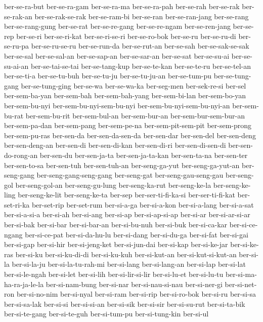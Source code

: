 {ber-se-ra-but ber-se-ra-gam ber-se-ra-ma ber-se-ra-pah ber-se-rah
ber-se-rak ber-se-rak-an ber-se-rak-se-rak ber-se-ram-bi ber-se-ran
ber-se-ran-jang ber-se-rang ber-se-rang-gung ber-se-rat ber-se-re-gang
ber-se-re-ngam ber-se-ren-jang ber-se-rep ber-se-ri ber-se-ri-kat
ber-se-ri-se-ri ber-se-ro-bok ber-se-ru ber-se-ru-di ber-se-ru-pa
ber-se-ru-se-ru ber-se-run-da ber-se-rut-an ber-se-sah ber-se-sak-se-sak
ber-se-sal ber-se-sal-an ber-se-sap-an ber-se-sar-an ber-se-sat
ber-se-su-ai ber-se-su-ai-an ber-se-tai-se-tai ber-se-tang-kup
ber-se-te-kan ber-se-te-ru ber-se-tel-an ber-se-ti-a ber-se-tu-buh
ber-se-tu-ju ber-se-tu-ju-an ber-se-tum-pu ber-se-tung-gang
ber-se-tung-ging ber-se-wa ber-se-wa-ka ber-seg-men ber-sek-re-si ber-sel
ber-sem-ba-yan ber-sem-bah ber-sem-bah-yang ber-sem-bi-lan ber-sem-bo-yan
ber-sem-bu-nyi ber-sem-bu-nyi-sem-bu-nyi ber-sem-bu-nyi-sem-bu-nyi-an
ber-sem-bu-rat ber-sem-bu-rit ber-sem-bul-an ber-sem-bur-an
ber-sem-bur-sem-bur-an ber-sem-pa-dan ber-sem-pang ber-sem-pe-na
ber-sem-pit-sem-pit ber-sem-prong ber-sem-pu-ras ber-sen-da
ber-sen-da-sen-da ber-sen-dar ber-sen-del ber-sen-deng ber-sen-deng-an
ber-sen-di ber-sen-di-kan ber-sen-di-ri ber-sen-di-sen-di
ber-sen-do-rong-an ber-sen-du ber-sen-ja-ta ber-sen-ja-ta-kan
ber-sen-ta-na ber-sen-ter ber-sen-to-sa ber-sen-tuh ber-sen-tuh-an
ber-seng-ga-yut ber-seng-ga-yut-an ber-seng-gang ber-seng-gang-seng-gang
ber-seng-gat ber-seng-gau-seng-gau ber-seng-gol ber-seng-gol-an
ber-seng-gu-lung ber-seng-ka-rut ber-seng-ke-la ber-seng-ke-ling
ber-seng-ke-lit ber-seng-ke-ta ber-sep ber-ser-ti-fi-ka-si
ber-ser-ti-fi-kat ber-set-ri-ka ber-set-rip ber-set-rum ber-si-a-ga
ber-si-a-kon ber-si-a-lang ber-si-a-sat ber-si-a-si-a ber-si-ah ber-si-ang
ber-si-ap ber-si-ap-si-ap ber-si-ar ber-si-ar-si-ar ber-si-bak ber-si-bar
ber-si-bar-an ber-si-bu-nuh ber-si-buk ber-si-ca-kar ber-si-ce-ngang
ber-si-ce-pat ber-si-da-hu-lu ber-si-dang ber-si-du-ga ber-si-fat
ber-si-gai ber-si-gap ber-si-hir ber-si-jeng-ket ber-si-jun-dai ber-si-kap
ber-si-ke-jar ber-si-ke-ras ber-si-ku ber-si-ku-di-di ber-si-ku-kuh
ber-si-kut-an ber-si-kut-si-kut-an ber-si-la ber-si-la-ju
ber-si-la-tu-rah-mi ber-si-lang ber-si-lang-an ber-si-lap ber-si-lat
ber-si-le-ngah ber-si-let ber-si-lih ber-si-lir-si-lir ber-si-lu-et
ber-si-lu-tu ber-si-ma-ha-ra-ja-le-la ber-si-nam-bung ber-si-nar
ber-si-nau-si-nau ber-si-ner-gi ber-si-net-ron ber-si-no-nim ber-si-nyal
ber-si-ram ber-si-rip ber-si-ro-bok ber-si-ru ber-si-sa ber-si-sa-lak
ber-si-si ber-si-si-an ber-si-sik ber-si-sir ber-si-su-rut ber-si-ta-bik
ber-si-te-gang ber-si-te-guh ber-si-tum-pu ber-si-tung-kin ber-si-ul
}

